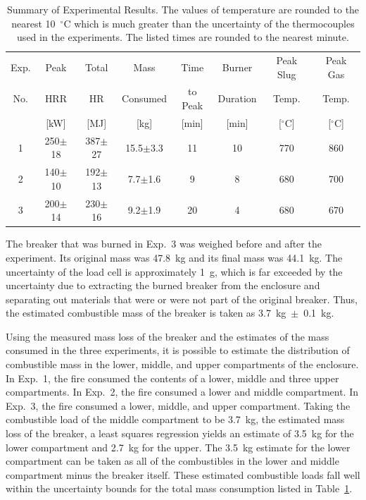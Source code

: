 \documentclass[12pt]{article}
\begin{document}
\begin{table}[ht]
\begin{center}
\caption[Summary of Experimental Results]{Summary of Experimental Results. The values of temperature are rounded to the nearest 10~$^\circ$C which is much greater than the uncertainty of the thermocouples used in the experiments. The listed times are rounded to the nearest minute.}
\label{matrix}
\begin{tabular}{|c|c|c|c|c|c|c|c|}
\hline
Exp.   & Peak           & Total     	& Mass          	& Time             & Burner       & Peak Slug    & Peak Gas      \\
No.    & HRR            & HR            & Consumed          & to Peak          & Duration     & Temp.        & Temp.         \\
       & [kW]      	    & [MJ]	        & [kg]        		& [min]  		   & [min] 	      & [$^\circ$C]  & [$^\circ$C]   \\ \hline
1	   & 250$\pm$18	    & 387$\pm$27	& 15.5$\pm$3.3	    & 11          	   & 10           & 770          & 860           \\ \hline
2	   & 140$\pm$10	    & 192$\pm$13	& 7.7$\pm$1.6	    & 9	               & 8            & 680          & 700           \\ \hline
3	   & 200$\pm$14	    & 230$\pm$16	& 9.2$\pm$1.9	    & 20        	   & 4            & 680          & 670           \\ \hline
\end{tabular}
\end{center}
\end{table}

The breaker that was burned in Exp.~3 was weighed before and after the experiment. Its original mass was 47.8~kg and its final mass was 44.1~kg. The uncertainty of the load cell is approximately 1~g, which is far exceeded by the uncertainty due to extracting the burned breaker from the enclosure and separating out materials that were or were not part of the original breaker. Thus, the estimated combustible mass of the breaker is taken as 3.7~kg~$\pm$~0.1~kg.

Using the measured mass loss of the breaker and the estimates of the mass consumed in the three experiments, it is possible to estimate the distribution of combustible mass in the lower, middle, and upper compartments of the enclosure. In Exp.~1, the fire consumed the contents of a lower, middle and three upper compartments. In Exp.~2, the fire consumed a lower and middle compartment. In Exp.~3, the fire consumed a lower, middle, and upper compartment. Taking the combustible load of the middle compartment to be 3.7~kg, the estimated mass loss of the breaker, a least squares regression yields an estimate of 3.5~kg for the lower compartment and 2.7~kg for the upper. The 3.5~kg estimate for the lower compartment can be taken as all of the combustibles in the lower and middle compartment minus the breaker itself. These estimated combustible loads fall well within the uncertainty bounds for the total mass consumption listed in Table~\ref{matrix}.
\end{document}
